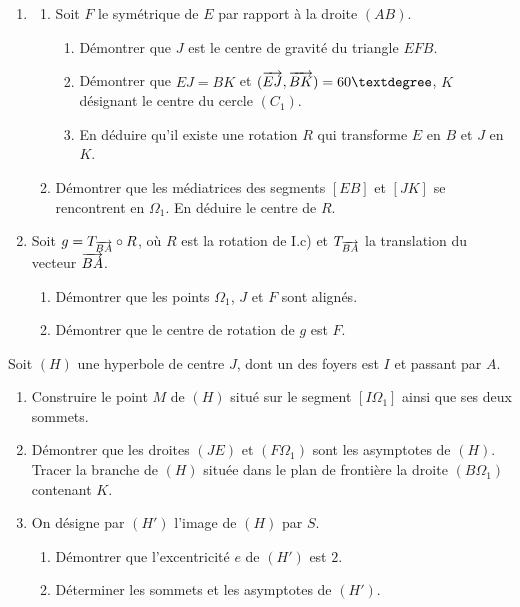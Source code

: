 \documentclass[11pt]{article}
\begin{document}
\begin{enumerate}[label=\Roman*.]
  \item \begin{enumerate}
    \item Soit $F$ le symétrique de $E$ par rapport à la droite $(AB)$.
    \begin{enumerate}[label=\alph*.]
      \item Démontrer que $J$ est le centre de gravité du triangle $EFB$.
      \item Démontrer que $EJ = BK$ et $(\vv{EJ},\vv{BK}) = 60°$, $K$ désignant le centre du cercle $(C_1)$.
      \item En déduire qu'il existe une rotation $R$ qui transforme $E$ en $B$ et $J$ en $K$.
    \end{enumerate}
    \item Démontrer que les médiatrices des segments $[EB]$ et $[JK]$ se rencontrent en $\Omega_1$. En déduire le centre de $R$.
  \end{enumerate}
  \item Soit $g = T_{\overrightarrow{BA}} \circ R$, où $R$ est la rotation de I.c) et $T_{\overrightarrow{BA}}$ la translation du vecteur $\overrightarrow{BA}$.
  \begin{enumerate}
    \item Démontrer que les points $\Omega_1$, $J$ et $F$ sont alignés.
    \item Démontrer que le centre de rotation de $g$ est $F$.
  \end{enumerate}
\end{enumerate}

Soit $(H)$ une hyperbole de centre $J$, dont un des foyers est $I$ et passant par $A$.
\begin{enumerate}
  \item Construire le point $M$ de $(H)$ situé sur le segment $[I\Omega_1]$ ainsi que ses deux sommets.
  \item Démontrer que les droites $(JE)$ et $(F\Omega_1)$ sont les asymptotes de $(H)$. Tracer la branche de $(H)$ située dans le plan de frontière la droite $(B\Omega_1)$ contenant $K$.
  \item On désigne par $(H')$ l'image de $(H)$ par $S$.
  \begin{enumerate}[label=\alph*.]
    \item Démontrer que l'excentricité $e$ de $(H')$ est $2$.
    \item Déterminer les sommets et les asymptotes de $(H')$.
  \end{enumerate}
\end{enumerate}
\end{document}
